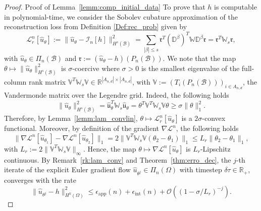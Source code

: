 \documentclass[pdflatex]{sn-jnl}%
\begin{document}
\vspace{0em}\begin{proof}{Proof of Lemma~\ref{lemm:comp_initial_data}}
    To prove that $h$ is computable in polynomial-time, we consider the Sobolev cubature approximation of the reconstruction loss from Definition \ref{Def:rec_prob} given by
    \begin{equation}
        \mathcal{L}^n_r[\hat{u}_\theta]:= \|\hat{u}_\theta-\mathcal{I}_n[h]\|_{H^s(\mathcal{B})}^2 = \sum\limits_{|\beta|\leq s}\mathfrak{r}^T(\mathbb{D}^{\beta})^T\mathbb{W}\mathbb{D}^{\beta}\mathfrak{r} = \mathfrak{r}^T\mathbb{W}_s\mathfrak{r},
    \end{equation}
    with $\hat{u}_\theta\in \Pi_{n}(\mathcal{B})$ and $\mathfrak{r}:=(\hat{u}_\theta-h)(P_n(\mathcal{B}))$. We note that the map $\theta\mapsto\|\hat{u}_\theta\|_{H^s(\mathcal{B})}^2$ is $\sigma$-coercive where $\sigma>0$ is the smallest eigenvalue of the full-column rank matrix $\mathbb{V}^T\mathbb{W}_s\mathbb{V}\in \mathbb{R}^{|A_{n,d}|\times|A_{n,d}|}$, with $\mathbb{V}:=(T_i(P_n(\mathcal{B})))_{i\in A_{n,d}}$, the Vandermonde matrix over the Legendre grid.  Indeed, the following holds
    \begin{equation}
        \|\hat{u}_\theta\|_{H^s(\mathcal{B})}^2 = \hat{\mathfrak{u}}_\theta^T\mathbb{W}_s\hat{\mathfrak{u}}_\theta = \theta^T\mathbb{V}^T\mathbb{W}_s\mathbb{V}\theta\geq \sigma\|\theta\|_1^2.
    \end{equation}
Therefore, by Lemma~\ref{lemm:lam_convlin}, $\theta\mapsto\mathcal{L}^n_r[\hat{u}_\theta]$ is a $2\sigma$-convex functional. Moreover, by definition of the gradient $\nabla\mathcal{L}^n$, the following holds
\begin{equation}
    \|\nabla\mathcal{L}^n[\hat{u}_{\theta_1}]-\nabla\mathcal{L}^n[\hat{u}_{\theta_2}]\|_1 = 2 \|\mathbb{V}^T\mathbb{W}_s\mathbb{V}(\theta_2-\theta_1)\|_1\leq L_r\|\theta_2-\theta_1\|_1,
\end{equation}
with $L_r:= 2\|\mathbb{V}^T\mathbb{W}_s\mathbb{V}\|_{\infty}$. Hence, the map $\theta\mapsto \nabla\mathcal{L}^n[\hat{u}_\theta]$ is $L_r$-Lipschitz continuous. 
By Remark~\ref{rk:lam_conv} and Theorem~\ref{thm:erro_dec}, the $j$-th iterate of the explicit Euler gradient flow $\hat{u}_{\theta^j}\in \Pi_{n}(\Omega)$ with timestep $\delta\tau \in \mathbb{R}_+$, converges with the rate
\begin{equation}
    \|\hat{u}_{\theta^j}-h\|_{H^k(\Omega)}^2\leq \epsilon_{\mathrm{app}}(n)+ \epsilon_{\mathrm{int}}(n)+\mathcal{O}\left((1-\sigma/L_r)^{- j}\right).
\end{equation}

\end{proof}
\end{document}
